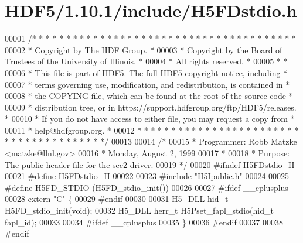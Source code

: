 \hypertarget{_h_d_f5_21_810_81_2include_2_h5_f_dstdio_8h_source}{}\section{H\+D\+F5/1.10.1/include/\+H5\+F\+Dstdio.h}
\label{_h_d_f5_21_810_81_2include_2_h5_f_dstdio_8h_source}

\begin{DoxyCode}
00001 \textcolor{comment}{/* * * * * * * * * * * * * * * * * * * * * * * * * * * * * * * * * * * * * * *}
00002 \textcolor{comment}{ * Copyright by The HDF Group.                                               *}
00003 \textcolor{comment}{ * Copyright by the Board of Trustees of the University of Illinois.         *}
00004 \textcolor{comment}{ * All rights reserved.                                                      *}
00005 \textcolor{comment}{ *                                                                           *}
00006 \textcolor{comment}{ * This file is part of HDF5.  The full HDF5 copyright notice, including     *}
00007 \textcolor{comment}{ * terms governing use, modification, and redistribution, is contained in    *}
00008 \textcolor{comment}{ * the COPYING file, which can be found at the root of the source code       *}
00009 \textcolor{comment}{ * distribution tree, or in https://support.hdfgroup.org/ftp/HDF5/releases.  *}
00010 \textcolor{comment}{ * If you do not have access to either file, you may request a copy from     *}
00011 \textcolor{comment}{ * help@hdfgroup.org.                                                        *}
00012 \textcolor{comment}{ * * * * * * * * * * * * * * * * * * * * * * * * * * * * * * * * * * * * * * */}
00013 
00014 \textcolor{comment}{/*}
00015 \textcolor{comment}{ * Programmer:  Robb Matzke <matzke@llnl.gov>}
00016 \textcolor{comment}{ *              Monday, August  2, 1999}
00017 \textcolor{comment}{ *}
00018 \textcolor{comment}{ * Purpose: The public header file for the sec2 driver.}
00019 \textcolor{comment}{ */}
00020 \textcolor{preprocessor}{#ifndef H5FDstdio\_H}
00021 \textcolor{preprocessor}{#define H5FDstdio\_H}
00022 
00023 \textcolor{preprocessor}{#include "H5Ipublic.h"}
00024 
00025 \textcolor{preprocessor}{#define H5FD\_STDIO  (H5FD\_stdio\_init())}
00026 
00027 \textcolor{preprocessor}{#ifdef \_\_cplusplus}
00028 \textcolor{keyword}{extern} \textcolor{stringliteral}{"C"} \{
00029 \textcolor{preprocessor}{#endif}
00030 
00031 H5\_DLL hid\_t H5FD\_stdio\_init(\textcolor{keywordtype}{void});
00032 H5\_DLL herr\_t H5Pset\_fapl\_stdio(hid\_t fapl\_id);
00033 
00034 \textcolor{preprocessor}{#ifdef \_\_cplusplus}
00035 \}
00036 \textcolor{preprocessor}{#endif}
00037 
00038 \textcolor{preprocessor}{#endif}
\end{DoxyCode}
